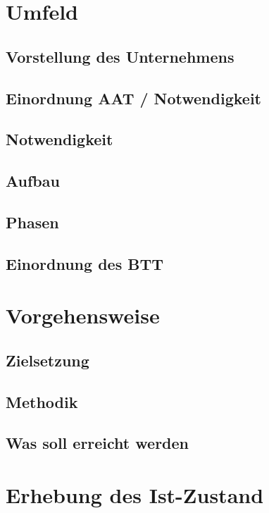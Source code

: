 \documentclass[12pt, titlepage]{article}
\begin{document}


\doublespacing







\newpage
\section{Umfeld}
\subsection{Vorstellung des Unternehmens}
\subsection{Einordnung AAT / Notwendigkeit}
\subsection{Notwendigkeit}
\subsection{Aufbau}
\subsection{Phasen}
\subsection{Einordnung des BTT}

\newpage
\section{Vorgehensweise}
\subsection{Zielsetzung}
\subsection{Methodik}
\subsection{Was soll erreicht werden}

\newpage
\section{Erhebung des Ist-Zustand}
\end{document}
